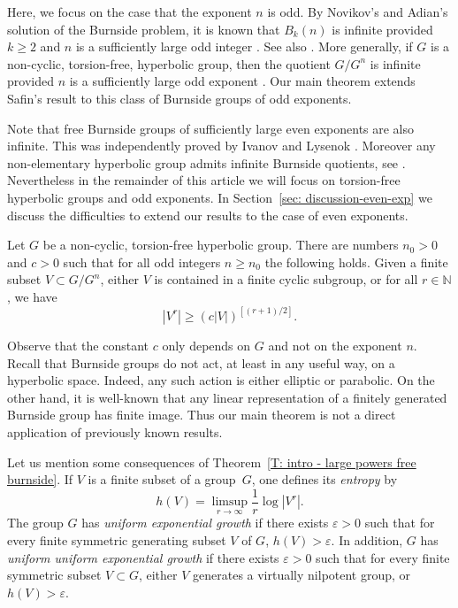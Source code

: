 Here, we focus on the case that the exponent $n$ is odd.
By Novikov's and Adian's solution of the Burnside problem, it is known that $B_k(n)$ is infinite provided $k \geq 2$ and $n$ is a sufficiently large odd integer \cite{adian_burnside_1979}. See also \cite{olshanksii_novikov_1982,delzant_courbure_2008}.
More generally, if $G$ is a non-cyclic, torsion-free, hyperbolic group, then the quotient $G/G^n$ is infinite provided $n$ is a sufficiently large odd exponent \cite{olshanskii_periodic_1991,delzant_courbure_2008}.
Our main theorem extends Safin's result to this class of Burnside groups of odd exponents.

\begin{rem}
Note that free Burnside groups of sufficiently large even exponents are also infinite.
This was independently proved by Ivanov \cite{Ivanov:1994kh} and Lysenok \cite{Lysenok:1996kw}.
Moreover any non-elementary hyperbolic group admits infinite Burnside quotients, see \cite{Ivanov:1996va,coulon_infinite_2018}.
Nevertheless in the remainder of this article we will focus on torsion-free hyperbolic groups and odd exponents.
In Section~\ref{sec: discussion-even-exp} we discuss the difficulties to extend our results to the case of even exponents.
\end{rem}

\begin{thm}\label{T: intro - large powers free burnside}
Let $G$ be a non-cyclic, torsion-free hyperbolic group.
There are numbers $n_0>0$ and $c >0$ such that for all odd integers $n\geqslant n_0$ the following holds.
Given a finite subset $V \subset G/G^n$, either $V$ is contained in a finite cyclic subgroup, or for all $r\in \mathbb N$, we have
\[
|V^r|\geqslant \left( c |V| \right)^{[(r+1)/2]}.
\]
\end{thm}

Observe that the constant $c$ only depends on $G$ and not on the exponent $n$.
Recall that Burnside groups do not act, at least in any useful way, on a hyperbolic space.
Indeed, any such action is either elliptic or parabolic.
On the other hand, it is well-known that any linear representation of a finitely generated Burnside group has finite image.
Thus our main theorem is not a direct application of previously known results.

Let us mention some consequences of Theorem~\ref{T: intro - large powers free burnside}.
If $V$ is a finite subset of a group~$G$, one defines its \emph{entropy} by
\begin{equation*}
h(V)= \limsup_{r \to \infty} \frac{1}{r}\log |V^r|.
\end{equation*}
The group $G$ has \emph{uniform exponential growth} if there exists $\varepsilon > 0$ such that for every finite symmetric generating subset $V$ of $G$, $h(V) > \varepsilon$.
In addition, $G$ has \emph{uniform uniform exponential growth} if there exists $\varepsilon > 0$ such that for every finite symmetric subset $V \subset G$, either $V$ generates a virtually nilpotent group, or $h(V) > \varepsilon$.

